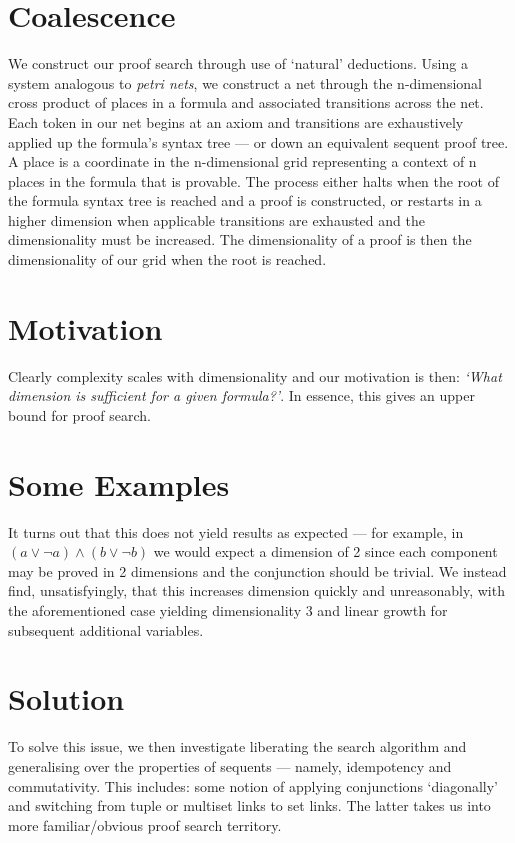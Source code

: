     \section*{Coalescence}
        We construct our proof search through use of `natural' deductions.
        Using a system analogous to \textit{petri nets}, we construct a net through the n-dimensional cross product of places in a formula and associated transitions across the net.
        Each token in our net begins at an axiom and transitions are exhaustively applied up the formula's syntax tree --- or down an equivalent sequent proof tree.
        A place is a coordinate in the n-dimensional grid representing a context of n places in the formula that is provable.
        The process either halts when the root of the formula syntax tree is reached and a proof is constructed, or restarts in a higher dimension when applicable transitions are exhausted and the dimensionality must be increased.
        The dimensionality of a proof is then the dimensionality of our grid when the root is reached.

    \section*{Motivation}
        Clearly complexity scales with dimensionality and our motivation is then: \textit{`What dimension is sufficient for a given formula?'}.
        In essence, this gives an upper bound for proof search.

    \section*{Some Examples}
        It turns out that this does not yield results as expected --- for example, in $(a \vee \neg a) \wedge (b \vee \neg b)$ we would expect a dimension of 2 since each component may be proved in 2 dimensions and the conjunction should be trivial.
        We instead find, unsatisfyingly, that this increases dimension quickly and unreasonably, with the aforementioned case yielding dimensionality 3 and linear growth for subsequent additional variables.

    \section*{Solution}
        To solve this issue, we then investigate liberating the search algorithm and generalising over the properties of sequents --- namely, idempotency and commutativity.
        This includes: some notion of applying conjunctions `diagonally' and switching from tuple or multiset links to set links.
        The latter takes us into more familiar/obvious proof search territory.
        
